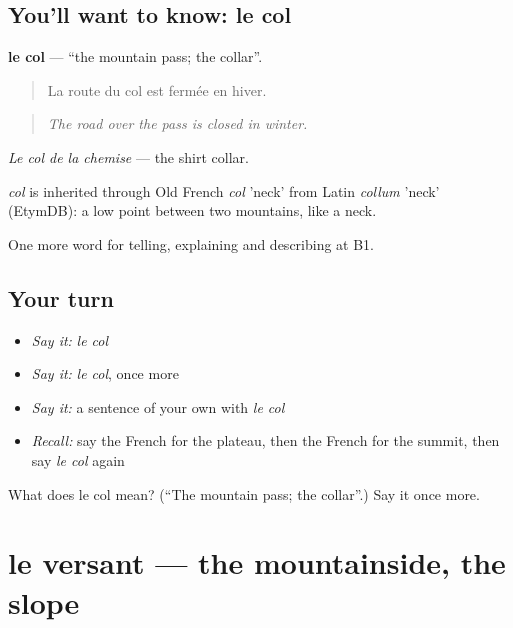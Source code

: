 \subsection*{You'll want to know: le col}
\textbf{le col} — \textquotedblleft{}the mountain pass; the collar\textquotedblright{}.

\begin{quote}
La route du col est fermée en hiver.
\end{quote}

\begin{quote}
\emph{The road over the pass is closed in winter.}
\end{quote}

\emph{Le col de la chemise} — the shirt collar.

\begin{cousinweb}
\emph{col} is inherited through Old French \emph{col} 'neck' from Latin \emph{collum} 'neck' (EtymDB): a low point between two mountains, like a neck.
\end{cousinweb}

\begin{grammarlens}[title={What you've built}]
One more word for telling, explaining and describing at B1.
\end{grammarlens}

\subsection*{Your turn}
\begin{itemize}
\raggedright
  \item \emph{Say it:} \emph{le col}
  \item \emph{Say it:} \emph{le col}, once more
  \item \emph{Say it:} a sentence of your own with \emph{le col}
  \item \emph{Recall:} say the French for the plateau, then the French for the summit, then say \emph{le col} again
\end{itemize}

\begin{tcolorbox}[breakable,colback=teal!4,colframe=teal!35!black,title={Before you move on}]
What does le col mean? (\textquotedblleft{}The mountain pass; the collar\textquotedblright{}.) Say it once more.
\end{tcolorbox}
\section[le versant]{le versant — the mountainside, the slope}

